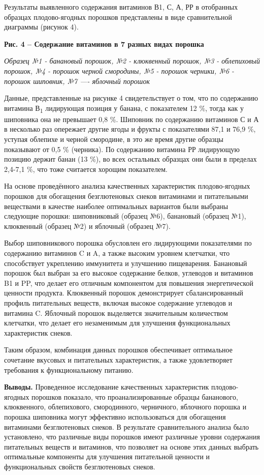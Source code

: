 {Результаты выявленного содержания витаминов В1, С, А, РР в отобранных
образцах плодово-ягодных порошков представлены в виде сравнительной
диаграммы (рисунок 4).

{\bfseries Рис. 4 -- Содержание витаминов в 7 разных видах порошка}

\emph{Образец №1 - банановый порошок, №2 - клюквенный порошок, №3 -
облепиховый порошок, №4 - порошок черной смородины, №5 - порошок
черники, №6 - порошок шиповник, №7 ---\/- яблочный порошок}

Данные, представленные на рисунке 4 свидетельствует о том, что по
содержанию витамина В\textsubscript{1} лидирующая позиция у банана, с
показателем 12 \%, тогда как у шиповника она не превышает 0,8 \%.
Шиповник по содержанию витаминов С и А в несколько раз опережает другие
ягоды и фрукты с показателями 87,1 и 76,9 \%, уступая облепихе и черной
смородине, в это же время другие образцы показывают от 0,5 \% (черника).
По содержанию витамина РР лидирующую позицию держит банан (13 \%), во
всех остальных образцах они были в пределах 2,4-7,1 \%, что тоже
считается хорощим показателем.

На основе проведённого анализа качественных характеристик
плодово-ягодных порошков для обогащения безглютеновых снеков витаминами
и питательными веществами в качестве наиболее оптимальных вариантов были
выбраны следующие порошки: шиповниковый (образец №6), банановый (образец
№1), клюквенный (образец №2) и яблочный (образец №7).

Выбор шиповникового порошка обусловлен его лидирующими показателями по
содержанию витаминов C и A, а также высоким уровнем клетчатки, что
способствует укреплению иммунитета и улучшению пищеварения. Банановый
порошок был выбран за его высокое содержание белков, углеводов и
витаминов B1 и PP, что делает его отличным компонентом для повышения
энергетической ценности продукта. Клюквенный порошок демонстрирует
сбалансированный профиль питательных веществ, включая высокое содержание
углеводов и витамина C. Яблочный порошок выделяется значительным
количеством клетчатки, что делает его незаменимым для улучшения
функциональных характеристик снеков.

Таким образом, комбинация данных порошков обеспечивает оптимальное
сочетание вкусовых и питательных характеристик, а также удовлетворяет
требования к функциональному питанию.

{\bfseries Выводы.} Проведенное исследование качественных характеристик
плодово-ягодных порошков показало, что проанализированные образцы
бананового, клюквенного, облепихового, смородинного, черничного,
яблочного порошка и порошка шиповника могут эффективно использоваться
для обогащения витаминами безглютеновых снеков. В результате
сравнительного анализа было установлено, что различные виды порошков
имеют различные уровни содержания питательных веществ и витаминов, что
позволяет на основе этих данных выбрать оптимальные компоненты для
улучшения питательной ценности и функциональных свойств безглютеновых
снеков.

}
